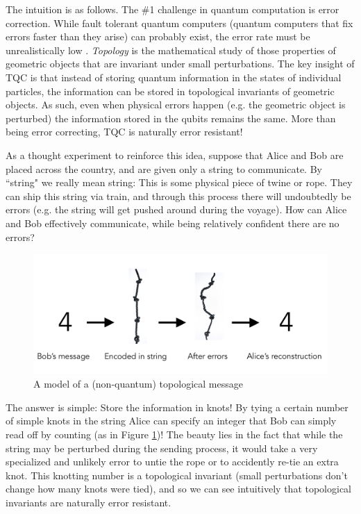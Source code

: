 \documentclass{article}
\theoremstyle{definition}
\numberwithin{figure}{section}
\begin{document}
The intuition is as follows. The $\#$1 challenge in quantum computation is error correction. While fault tolerant quantum computers (quantum computers that fix errors faster than they arise) can probably exist, the error rate must be unrealistically low \cite{gottesman1998theory}. \textit{Topology} is the mathematical study of those properties of geometric objects that are invariant under small perturbations. The key insight of TQC is that instead of storing quantum information in the states of individual particles, the information can be stored in topological invariants of geometric objects. As such, even when physical errors happen (e.g. the geometric object is perturbed) the information stored in the qubits remains the same. More than being error correcting, TQC is naturally error resistant!

As a thought experiment to reinforce this idea, suppose that Alice and Bob are placed across the country, and are given only a string to communicate. By ``string" we really mean string: This is some physical piece of twine or rope. They can ship this string via train, and through this process there will undoubtedly be errors (e.g. the string will get pushed around during the voyage). How can Alice and Bob effectively communicate, while being relatively confident there are no errors?

\begin{figure}
\begin{center}
\includegraphics[scale=0.25]{rope-deformations}
\caption{A model of a (non-quantum) topological message}
\label{fig:rope-deformations}
\end{center}
\end{figure}

The answer is simple: Store the information in knots! By tying a certain number of simple knots in the string Alice can specify an integer that Bob can simply read off by counting (as in Figure \ref{fig:rope-deformations})! The beauty lies in the fact that while the string may be perturbed during the sending process, it would take a very specialized and unlikely error to untie the rope or to accidently re-tie an extra knot. This knotting number is a topological invariant (small perturbations don't change how many knots were tied), and so we can see intuitively that topological invariants are naturally error resistant.
\end{document}
